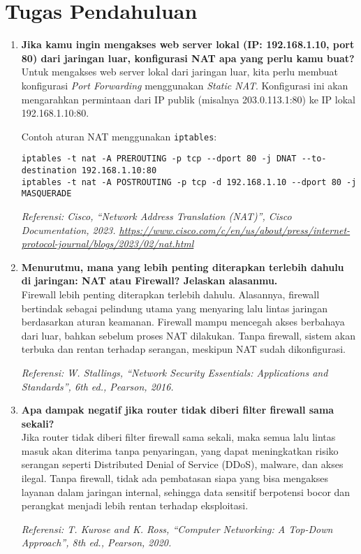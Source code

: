 \section{Tugas Pendahuluan}
\begin{enumerate}
    \item \textbf{Jika kamu ingin mengakses web server lokal (IP: 192.168.1.10, port 80) dari jaringan luar, konfigurasi NAT apa yang perlu kamu buat?}\\
    Untuk mengakses web server lokal dari jaringan luar, kita perlu membuat konfigurasi \textit{Port Forwarding} menggunakan \textit{Static NAT}. Konfigurasi ini akan mengarahkan permintaan dari IP publik (misalnya 203.0.113.1:80) ke IP lokal 192.168.1.10:80.

    Contoh aturan NAT menggunakan \texttt{iptables}:
    \begin{verbatim}
iptables -t nat -A PREROUTING -p tcp --dport 80 -j DNAT --to-destination 192.168.1.10:80
iptables -t nat -A POSTROUTING -p tcp -d 192.168.1.10 --dport 80 -j MASQUERADE
    \end{verbatim}

    \textit{Referensi: Cisco, ``Network Address Translation (NAT)'', Cisco Documentation, 2023. \url{https://www.cisco.com/c/en/us/about/press/internet-protocol-journal/blogs/2023/02/nat.html}}

    \item \textbf{Menurutmu, mana yang lebih penting diterapkan terlebih dahulu di jaringan: NAT atau Firewall? Jelaskan alasanmu.}\\
    Firewall lebih penting diterapkan terlebih dahulu. Alasannya, firewall bertindak sebagai pelindung utama yang menyaring lalu lintas jaringan berdasarkan aturan keamanan. Firewall mampu mencegah akses berbahaya dari luar, bahkan sebelum proses NAT dilakukan. Tanpa firewall, sistem akan terbuka dan rentan terhadap serangan, meskipun NAT sudah dikonfigurasi.

    \textit{Referensi: W. Stallings, ``Network Security Essentials: Applications and Standards'', 6th ed., Pearson, 2016.}

    \item \textbf{Apa dampak negatif jika router tidak diberi filter firewall sama sekali?}\\
    Jika router tidak diberi filter firewall sama sekali, maka semua lalu lintas masuk akan diterima tanpa penyaringan, yang dapat meningkatkan risiko serangan seperti Distributed Denial of Service (DDoS), malware, dan akses ilegal. Tanpa firewall, tidak ada pembatasan siapa yang bisa mengakses layanan dalam jaringan internal, sehingga data sensitif berpotensi bocor dan perangkat menjadi lebih rentan terhadap eksploitasi.

    \textit{Referensi: T. Kurose and K. Ross, ``Computer Networking: A Top-Down Approach'', 8th ed., Pearson, 2020.}
\end{enumerate}
